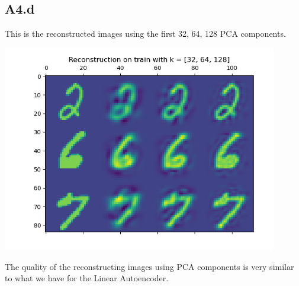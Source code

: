 \documentclass[]{article}
\begin{document}
    \subsection*{A4.d}
        This is the reconstructed images using the first 32, 64, 128 PCA components. 
        \begin{center}
            \includegraphics*[width=12cm]{A4plots/22-50-33-pca-reconstruction.png}
        \end{center}
        The quality of the reconstructing images using PCA components is very similar to what we have for the Linear Autoencoder. 
\end{document}
